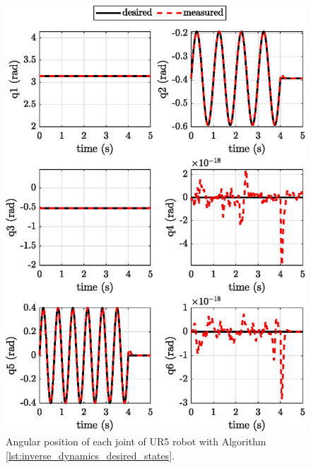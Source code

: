 \begin{figure}[H]
    \centering
    \includegraphics{images/act_2.6/joint_position.eps}
    \caption{Angular position of each joint of UR5 robot with Algorithm \ref{lst:inverse_dynamics_desired_states}.}
    \label{fig:act_2.6_joint_position}
\end{figure}

